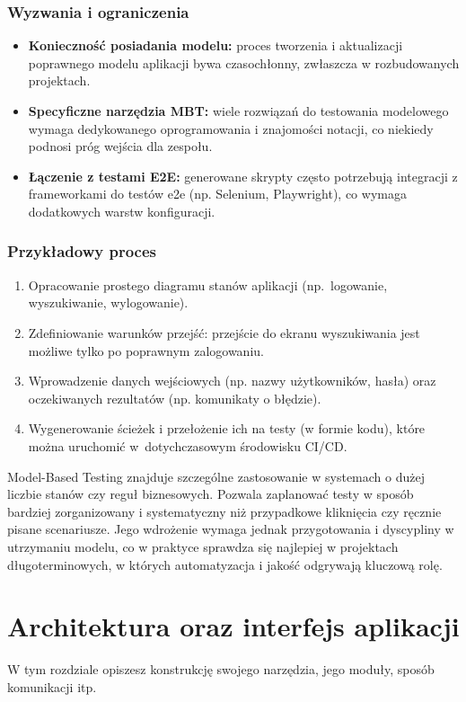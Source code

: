 \documentclass[12pt]{report}
\begin{document}
\subsection*{Wyzwania i ograniczenia}
\begin{itemize}
    \item \textbf{Konieczność posiadania modelu:} proces tworzenia i aktualizacji poprawnego modelu aplikacji bywa czasochłonny, zwłaszcza w rozbudowanych projektach.
    \item \textbf{Specyficzne narzędzia MBT:} wiele rozwiązań do testowania modelowego wymaga dedykowanego oprogramowania i znajomości notacji, co niekiedy podnosi próg wejścia dla zespołu.
    \item \textbf{Łączenie z testami E2E:} generowane skrypty często potrzebują integracji z frameworkami do testów e2e (np. Selenium, Playwright), co wymaga dodatkowych warstw konfiguracji.
\end{itemize}

\subsection*{Przykładowy proces}
\begin{enumerate}
    \item Opracowanie prostego diagramu stanów aplikacji (np.~logowanie, wyszukiwanie, wylogowanie).
    \item Zdefiniowanie warunków przejść: przejście do ekranu wyszukiwania jest możliwe tylko po poprawnym zalogowaniu.
    \item Wprowadzenie danych wejściowych (np. nazwy użytkowników, hasła) oraz oczekiwanych rezultatów (np. komunikaty o błędzie).
    \item Wygenerowanie ścieżek i przełożenie ich na testy (w formie kodu), które można uruchomić w~dotychczasowym środowisku CI/CD.
\end{enumerate}

Model-Based Testing znajduje szczególne zastosowanie w systemach o dużej liczbie stanów czy reguł biznesowych. Pozwala zaplanować testy w sposób bardziej zorganizowany i systematyczny niż przypadkowe kliknięcia czy ręcznie pisane scenariusze. Jego wdrożenie wymaga jednak przygotowania i dyscypliny w utrzymaniu modelu, co w praktyce sprawdza się najlepiej w projektach długoterminowych, w których automatyzacja i jakość odgrywają kluczową rolę.

\chapter{Architektura oraz interfejs aplikacji}
{W tym rozdziale opiszesz konstrukcję swojego narzędzia, jego moduły, sposób komunikacji itp.}
\end{document}
